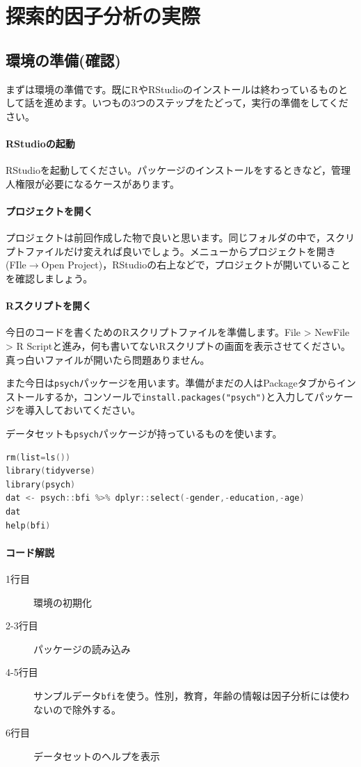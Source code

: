 \documentclass{ltjsbook}
\begin{document}
\section{探索的因子分析の実際}
\subsection{環境の準備(確認)}
まずは環境の準備です。既にRやRStudioのインストールは終わっているものとして話を進めます。いつもの3つのステップをたどって，実行の準備をしてください。
\paragraph{RStudioの起動}RStudioを起動してください。パッケージのインストールをするときなど，管理人権限が必要になるケースがあります。
\paragraph{プロジェクトを開く}プロジェクトは前回作成した物で良いと思います。同じフォルダの中で，スクリプトファイルだけ変えれば良いでしょう。メニューからプロジェクトを開き(FIle$\to$Open Project)，RStudioの右上などで，プロジェクトが開いていることを確認しましょう。
\paragraph{Rスクリプトを開く}今日のコードを書くためのRスクリプトファイルを準備します。File > NewFile > R Scriptと進み，何も書いてないRスクリプトの画面を表示させてください。真っ白いファイルが開いたら問題ありません。

また今日は\texttt{psych}パッケージ\citep{psych}を用います。準備がまだの人はPackageタブからインストールするか，コンソールで\texttt{install.packages("psych")}と入力してパッケージを導入しておいてください。

データセットも\texttt{psych}パッケージが持っているものを使います。
\begin{lstlisting}[language=c++,label={code::10_01},caption={サンプルデータを使う}]
rm(list=ls())
library(tidyverse)
library(psych)
dat <- psych::bfi %>% dplyr::select(-gender,-education,-age)
dat
help(bfi)
\end{lstlisting}

\paragraph{コード解説}
\begin{description}
    \item[1行目] 環境の初期化
    \item[2-3行目] パッケージの読み込み
    \item[4-5行目] サンプルデータ\texttt{bfi}を使う。性別，教育，年齢の情報は因子分析には使わないので除外する。
    \item[6行目] データセットのヘルプを表示
\end{description}
\end{document}
